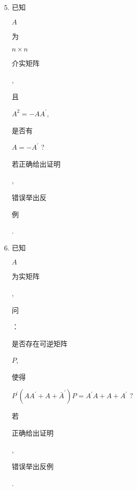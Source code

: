\documentclass[10pt]{article}
\begin{document}
\begin{enumerate}
  \setcounter{enumi}{4}
  \item \begin{CJK}{UTF8}{mj}已知\end{CJK} $A$ \begin{CJK}{UTF8}{mj}为\end{CJK} $n \times n$ \begin{CJK}{UTF8}{mj}介实矩阵\end{CJK}, \begin{CJK}{UTF8}{mj}且\end{CJK} $A^{2}=-A A^{\prime}$, \begin{CJK}{UTF8}{mj}是否有\end{CJK} $A=-A^{\prime}$ ? \begin{CJK}{UTF8}{mj}若正确给出证明\end{CJK}, \begin{CJK}{UTF8}{mj}错误举出反\end{CJK} \begin{CJK}{UTF8}{mj}例\end{CJK}.

  \item \begin{CJK}{UTF8}{mj}已知\end{CJK} $A$ \begin{CJK}{UTF8}{mj}为实矩阵\end{CJK}, \begin{CJK}{UTF8}{mj}问\end{CJK}：\begin{CJK}{UTF8}{mj}是否存在可逆矩阵\end{CJK} $P$, \begin{CJK}{UTF8}{mj}使得\end{CJK} $P^{\prime}\left(A A^{\prime}+A+\bar{A}^{\prime}\right) P=A^{\prime} A+A+A^{\prime}$ ? \begin{CJK}{UTF8}{mj}若\end{CJK} \begin{CJK}{UTF8}{mj}正确给出证明\end{CJK}, \begin{CJK}{UTF8}{mj}错误举出反例\end{CJK}.


\end{enumerate}
\end{document}
